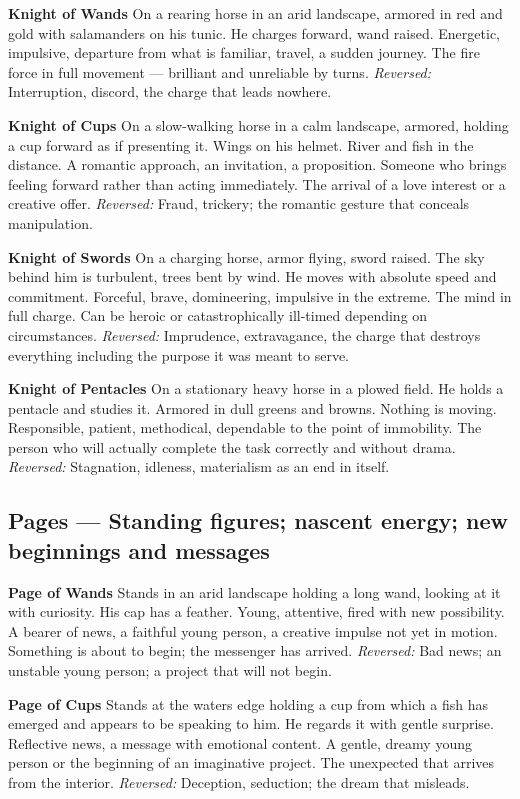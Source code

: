 \textbf{Knight of Wands} On a rearing horse in an arid landscape, armored in red and gold with salamanders on his tunic. He charges forward, wand raised. Energetic, impulsive, departure from what is familiar, travel, a sudden journey. The fire force in full movement --- brilliant and unreliable by turns. \emph{Reversed:} Interruption, discord, the charge that leads nowhere.

\textbf{Knight of Cups} On a slow-walking horse in a calm landscape, armored, holding a cup forward as if presenting it. Wings on his helmet. River and fish in the distance. A romantic approach, an invitation, a proposition. Someone who brings feeling forward rather than acting immediately. The arrival of a love interest or a creative offer. \emph{Reversed:} Fraud, trickery; the romantic gesture that conceals manipulation.

\textbf{Knight of Swords} On a charging horse, armor flying, sword raised. The sky behind him is turbulent, trees bent by wind. He moves with absolute speed and commitment. Forceful, brave, domineering, impulsive in the extreme. The mind in full charge. Can be heroic or catastrophically ill-timed depending on circumstances. \emph{Reversed:} Imprudence, extravagance, the charge that destroys everything including the purpose it was meant to serve.

\textbf{Knight of Pentacles} On a stationary heavy horse in a plowed field. He holds a pentacle and studies it. Armored in dull greens and browns. Nothing is moving. Responsible, patient, methodical, dependable to the point of immobility. The person who will actually complete the task correctly and without drama. \emph{Reversed:} Stagnation, idleness, materialism as an end in itself.

\subsection{Pages --- Standing figures; nascent energy; new beginnings and messages}\label{pages--standing-figures-nascent-energy-new-beginnings-and-messages}

\textbf{Page of Wands} Stands in an arid landscape holding a long wand, looking at it with curiosity. His cap has a feather. Young, attentive, fired with new possibility. A bearer of news, a faithful young person, a creative impulse not yet in motion. Something is about to begin; the messenger has arrived. \emph{Reversed:} Bad news; an unstable young person; a project that will not begin.

\textbf{Page of Cups} Stands at the water\textquotesingle s edge holding a cup from which a fish has emerged and appears to be speaking to him. He regards it with gentle surprise. Reflective news, a message with emotional content. A gentle, dreamy young person or the beginning of an imaginative project. The unexpected that arrives from the interior. \emph{Reversed:} Deception, seduction; the dream that misleads.

